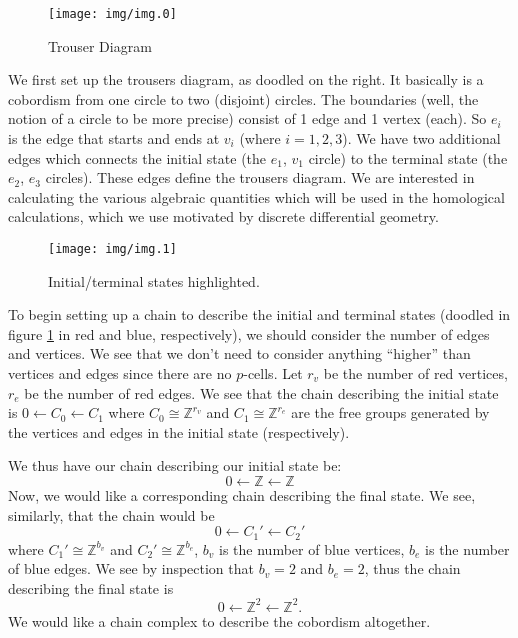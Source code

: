 
\begin{wrapfigure}{r}{0.55\textwidth}
  \begin{center}
    \texttt{[image: img/img.0]}
  \end{center}
  \caption{\footnotesize {Trouser Diagram}}
\end{wrapfigure}
We first set up the trousers diagram, as doodled on the right. It
basically is a cobordism from one circle to two (disjoint)
circles. The boundaries (well, the notion of a circle to be more
precise) consist of 1 edge and 1 vertex (each). So $e_{i}$ is the
edge that starts and ends at $v_{i}$ (where $i=1,2,3$). We have
two additional edges which connects the initial state (the
$e_{1}$, $v_{1}$ circle) to the terminal state (the $e_{2}$,
$e_{3}$ circles). These edges define the trousers diagram. We are
interested in calculating the various algebraic quantities which
will be used in the homological calculations, which we use
motivated by discrete differential geometry.

\begin{figure}[t]
  \begin{center}
    \texttt{[image: img/img.1]}
  \end{center}
  \caption{Initial/terminal states highlighted.}\label{fig:img1}
\end{figure}
To begin setting up a chain to describe the initial and terminal
states (doodled in figure \ref{fig:img1} in red and blue, respectively), we
should consider the number of edges and vertices.
We see that we don't need to consider anything ``higher'' than
vertices and edges since there are no $p$-cells. Let $r_{v}$ be
the number of red vertices, $r_{e}$ be the number of red
edges. We see that the chain describing the initial state is
$0 \leftarrow C_{0}\leftarrow C_{1}$
where $C_{0}\cong\mathbb{Z}^{r_{v}}$ and
$C_{1}\cong\mathbb{Z}^{r_{e}}$ are the free groups generated by
the vertices and edges in the initial state (respectively). 

We thus have our chain describing our initial state be:
\begin{equation}%
0 \leftarrow \mathbb{Z}\leftarrow \mathbb{Z}
\end{equation}
Now, we would like a corresponding chain describing the final
state. We see, similarly, that the chain would be 
\begin{equation}%
0\leftarrow C_{1}' \leftarrow C_{2}'
\end{equation}
where $C_{1}'\cong\mathbb{Z}^{b_{v}}$ and
$C_{2}'\cong\mathbb{Z}^{b_{e}}$, $b_{v}$ is the number of blue
vertices, $b_{e}$ is the number of blue edges. We see by
inspection that $b_{v}=2$ and $b_{e}=2$, thus the chain
describing the final state is
\begin{equation}%
0\leftarrow\mathbb{Z}^{2}\leftarrow\mathbb{Z}^{2}.
\end{equation}
We would like a chain complex to describe the cobordism altogether.

